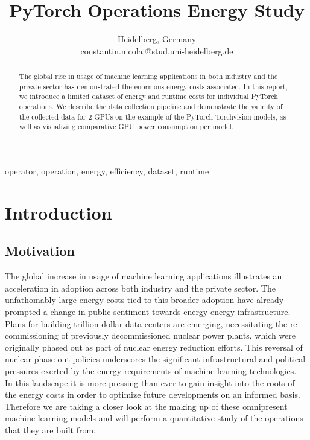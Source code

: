 \documentclass[conference]{IEEEtran}
\begin{document}
\title{PyTorch Operations Energy Study}

\author{
Heidelberg, Germany \\
constantin.nicolai@stud.uni-heidelberg.de}


\maketitle

\begin{abstract}
The global rise in usage of machine learning applications in both industry and the private sector has demonstrated the enormous energy costs associated. In this report, we introduce a limited dataset of energy and runtime costs for individual PyTorch operations. We describe the data collection pipeline and demonstrate the validity of the collected data for 2 GPUs on the example of the PyTorch Torchvision models, as well as visualizing comparative GPU power consumption per model.
\end{abstract}

\begin{IEEEkeywords}
operator, operation, energy, efficiency, dataset, runtime
\end{IEEEkeywords}

\section{Introduction}


\subsection{Motivation}
The global increase in usage of machine learning applications illustrates an acceleration in adoption across both industry and the private sector. The unfathomably large energy costs tied to this broader adoption have already prompted a change in public sentiment towards energy energy infrastructure.  Plans for building trillion-dollar data centers are emerging, necessitating the re-commissioning of previously decommissioned nuclear power plants, which were originally phased out as part of nuclear energy reduction efforts. This reversal of nuclear phase-out policies underscores the significant infrastructural and political pressures exerted by the energy requirements of machine learning technologies.\\
In this landscape it is more pressing than ever to gain insight into the roots of the energy costs in order to optimize future developments on an informed basis. Therefore we are taking a closer look at the making up of these omnipresent machine learning models and will perform a quantitative study of the operations that they are built from.
\end{document}

